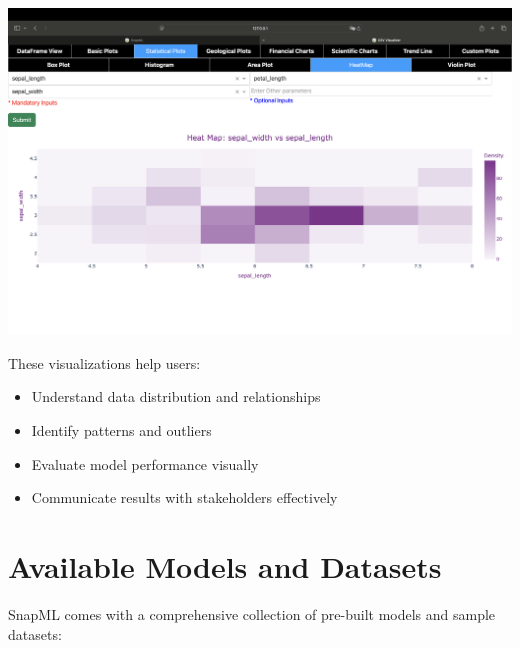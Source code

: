 \documentclass[a0paper,portrait]{article}
\newcommand{\compresslist}{%
\setlength{\itemsep}{0pt}%
\setlength{\parskip}{0pt}%
\setlength{\parsep}{0pt}%
}
\begin{document}
\begin{multicols}{2}
\begin{center}
\includegraphics[width=0.7\linewidth]{范例数据集的可视化4.png}
\end{center}

These visualizations help users:
\begin{itemize}\compresslist
    \item Understand data distribution and relationships
    \item Identify patterns and outliers
    \item Evaluate model performance visually
    \item Communicate results with stakeholders effectively
\end{itemize}

\section{Available Models and Datasets}

SnapML comes with a comprehensive collection of pre-built models and sample datasets:


\end{multicols}
\end{document}
